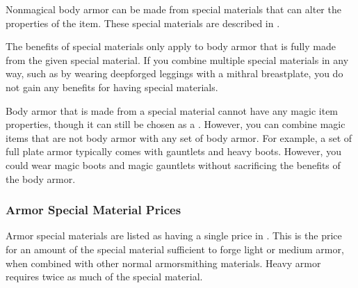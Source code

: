     Nonmagical body armor can be made from special materials that can alter the properties of the item.
    These special materials are described in .

    The benefits of special materials only apply to body armor that is fully made from the given special material.
    If you combine multiple special materials in any way, such as by wearing deepforged leggings with a mithral breastplate, you do not gain any benefits for having special materials.

    Body armor that is made from a special material cannot have any magic item properties, though it can still be chosen as a .
    However, you can combine magic items that are not body armor with any set of body armor.
    For example, a set of full plate armor typically comes with gauntlets and heavy boots.
    However, you could wear magic boots and magic gauntlets without sacrificing the benefits of the body armor.

    \subsubsection{Armor Special Material Prices}
      Armor special materials are listed as having a single price in .
      This is the price for an amount of the special material sufficient to forge light or medium armor, when combined with other normal armorsmithing materials.
      Heavy armor requires twice as much of the special material.

